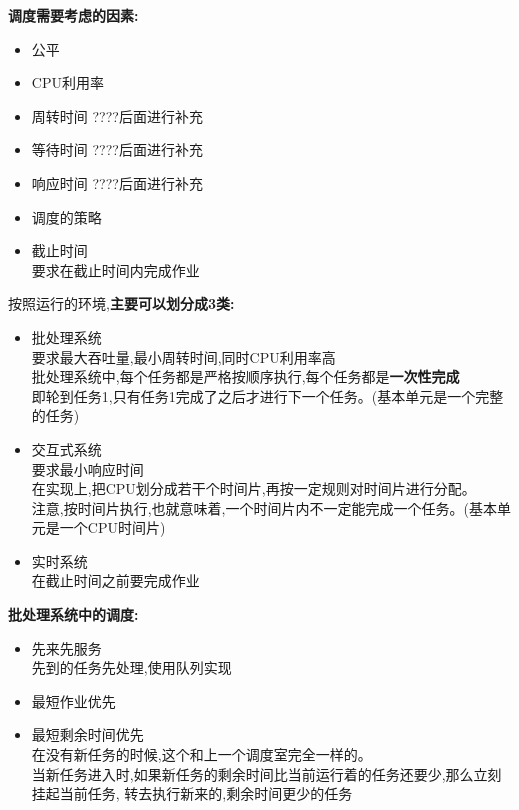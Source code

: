 \documentclass[UTF8,a4paper]{ctexart}
\newcommand{\spaceline}{\vspace{\baselineskip}}
\begin{document}
    \spaceline
    \textbf{调度需要考虑的因素:}
    \begin{itemize}
      \item 公平
      \item CPU利用率
      \item 周转时间{\color{red} ????后面进行补充}
      \item 等待时间{\color{red} ????后面进行补充}
      \item 响应时间{\color{red} ????后面进行补充}
      \item 调度的策略
      \item 截止时间\\要求在截止时间内完成作业
    \end{itemize}

    \spaceline
    按照运行的环境,\textbf{主要可以划分成3类:}
    \begin{itemize}
      \item 批处理系统\\
      要求最大吞吐量,最小周转时间,同时CPU利用率高\\
      批处理系统中,每个任务都是严格按顺序执行,每个任务都是\textbf{一次性完成}\\
      即轮到任务1,只有任务1完成了之后才进行下一个任务。(基本单元是一个完整的任务)
      \item 交互式系统\\
      要求最小响应时间\\
      在实现上,把CPU划分成若干个时间片,再按一定规则对时间片进行分配。\\
      注意,按时间片执行,也就意味着,一个时间片内不一定能完成一个任务。(基本单元是一个CPU时间片)
      \item 实时系统\\
      在截止时间之前要完成作业
    \end{itemize}

    \spaceline
    \textbf{批处理系统中的调度:}
    \begin{itemize}
      \item 先来先服务\\
      先到的任务先处理,使用队列实现
      \item 最短作业优先\\
      \item 最短剩余时间优先\\
      在没有新任务的时候,这个和上一个调度室完全一样的。\\
      当新任务进入时,如果新任务的剩余时间比当前运行着的任务还要少,那么立刻挂起当前任务,
      转去执行新来的,剩余时间更少的任务
    \end{itemize}
\end{document}
